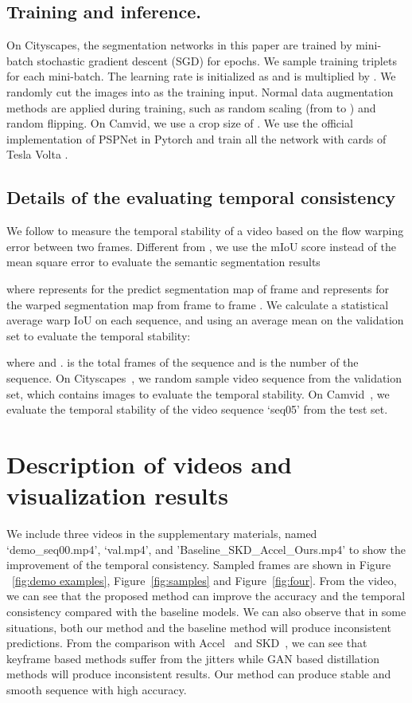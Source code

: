 \documentclass[runningheads]{llncs}
\begin{document}
\subsection{Training and inference.}
On Cityscapes, the segmentation networks in this paper are trained by mini-batch stochastic gradient descent (SGD) for  epochs. We sample  training triplets for each mini-batch. The learning rate is initialized as  and is multiplied by .  We randomly cut the images into  as the training input. Normal data augmentation methods are applied during training, such as random scaling (from  to ) and random flipping. On Camvid, we use a crop size of . We use the official implementation of PSPNet in Pytorch\cite{semseg2019} and train all the network with  cards of Tesla Volta .
\subsection{Details of the evaluating temporal consistency}
We follow \cite{lai2018learning} to measure the temporal stability of a video based on the flow warping error between two frames.
Different from \cite{lai2018learning}, we use the mIoU score instead of the mean square error to evaluate the semantic segmentation results

where  represents for the predict segmentation map of frame  and  represents for the warped segmentation map from frame  to frame .
We calculate a statistical average warp IoU on each sequence, and using an average mean on the validation set to evaluate the temporal stability:

where  and .  is the total frames of the sequence and  is the number of the sequence.
On Cityscapes~\cite{Cordts2016Cityscapes}, we random sample  video sequence from the validation set, which contains  images to evaluate the temporal stability. On Camvid~\cite{brostow2008segmentation}, we evaluate the temporal stability of the video sequence `seq05' from the test set.


\section{Description of videos and visualization results}
We include three videos in the supplementary materials, named `demo\_seq00.mp4', `val.mp4', and 'Baseline\_SKD\_Accel\_Ours.mp4' to show the improvement of the temporal consistency. Sampled frames are shown in Figure ~\ref{fig:demo examples}, Figure~\ref{fig:samples} and Figure~\ref{fig:four}. From the video, we can see that the proposed method can improve the accuracy and the temporal consistency compared with the baseline models. We can also observe that in some situations, both our method and the baseline method will produce inconsistent predictions. From the comparison with Accel~\cite{jain2019accel} and SKD~\cite{liu2019structured}, we can see that keyframe based methods suffer from the jitters while GAN based distillation methods will produce inconsistent results. Our method can produce stable and smooth sequence with high accuracy.
\end{document}
